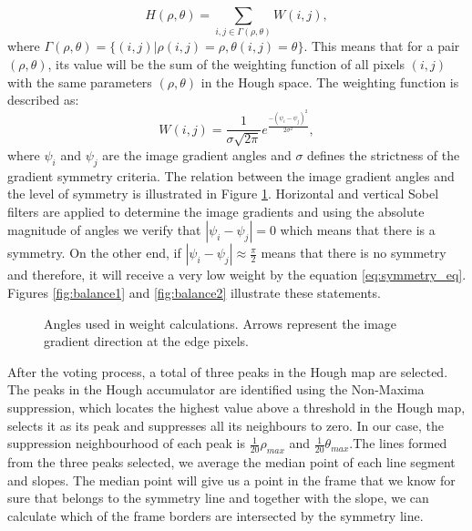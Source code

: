 \begin{description}
\begin{equation}
	H(\rho,\theta) = \sum_{i,j \in \Gamma(\rho,\theta)}W(i,j),
\end{equation}		
where $\Gamma(\rho,\theta) = \{(i,j) | \rho(i,j) = \rho, \theta(i,j) = \theta\}$.
This means that for a pair $(\rho,\theta)$, its value will be the sum of the weighting function of all pixels $(i,j)$ with the same parameters $(\rho,\theta)$ in the Hough space. The weighting function is described as:
\begin{equation}
	W(i,j) = \frac{1}{\sigma\sqrt{2\pi}}e^{\frac{-(\psi_{i}-\psi_{j})^{2}}{2\sigma^{2}}},
	\label{eq:symmetry_eq}
\end{equation}
where $\psi_{i}$ and $\psi_{j}$ are the image gradient angles and $\sigma$ defines the strictness of the gradient symmetry criteria. The relation between the image gradient angles and the level of symmetry is illustrated in Figure \ref{fig:image_balance_fig}. Horizontal and vertical Sobel filters are applied to determine the image gradients and using the absolute magnitude of angles we verify that $|\psi_{i} - \psi_{j}| = 0$ which means that there is a symmetry. On the other end, if $|\psi_{i} - \psi_{j}| \approx \frac{\pi}{2}$ means that there is no symmetry and therefore, it will receive a very low weight by the equation \ref{eq:symmetry_eq}. Figures \ref{fig:balance1} and \ref{fig:balance2} illustrate these statements.
\begin{figure}[htbp]
	\centering
    \caption{Angles used in weight calculations. Arrows represent the image gradient direction at the edge pixels. \cite{li2006real}}
    \label{fig:image_balance_fig}
\end{figure}

	After the voting process, a total of three peaks in the Hough map are selected. The peaks in the Hough accumulator are identified using the Non-Maxima suppression, which locates the highest value above a threshold in the Hough map, selects it as its peak and suppresses all its neighbours to zero. In our case, the suppression neighbourhood of each peak is $\frac{1}{20}\rho_{max}$ and $\frac{1}{20}\theta_{max}$.The lines formed from the three peaks selected, we average the median point of each line segment and slopes. The median point will give us a point in the frame that we know for sure that belongs to the symmetry line and together with the slope, we can calculate which of the frame borders are intersected by the symmetry line.
	

\end{description}
